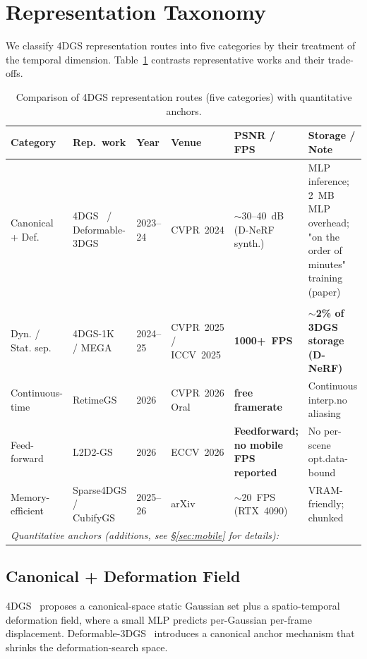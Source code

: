 
\section{Representation Taxonomy}
\label{sec:representation}

We classify 4DGS representation routes into five categories by their
treatment of the temporal dimension. Table~\ref{tab:representation}
contrasts representative works and their trade-offs.

\begin{table}[t]
  \centering
\caption{Comparison of 4DGS representation routes (five categories) with quantitative anchors.}
\label{tab:representation}
\scriptsize
\setlength{\tabcolsep}{3pt}
\renewcommand{\arraystretch}{1.05}
\begin{tabular}{lp{5.2cm}llp{2.4cm}p{4.5cm}}
\toprule
\textbf{Category} & \textbf{Rep.\ work} & \textbf{Year} & \textbf{Venue} & \textbf{PSNR / FPS} & \textbf{Storage / Note} \\
\midrule
Canonical + Def.       & 4DGS~\cite{wu20244dgs} / Deformable-3DGS~\cite{yang2023deformable3dgs} & 2023--24 & CVPR~2024 & $\sim$30--40~dB (D-NeRF synth.) & MLP inference; 2~MB MLP overhead; "on the order of minutes" training (paper) \\\\
Dyn. / Stat. sep.      & 4DGS-1K~\cite{yuan20254dgs1k} / MEGA~\cite{zhang2024mega4dgsacceleration} & 2024--25 & CVPR~2025 / ICCV~2025 & \textbf{1000+~FPS} & \textbf{$\sim$2\% of 3DGS storage (D-NeRF)} \\
Continuous-time        & RetimeGS~\cite{wang2026retimegs} & 2026 & CVPR~2026 Oral & \textbf{free framerate} & Continuous interp.\;no aliasing \\
Feed-forward           & L2D2-GS~\cite{song2026l2d2gs} & 2026 & ECCV~2026     & \textbf{Feedforward; no mobile FPS reported} & No per-scene opt.\;data-bound \\
Memory-efficient       & Sparse4DGS / CubifyGS~\cite{ren2026cubifygs} & 2025--26 & arXiv & $\sim$20~FPS (RTX~4090) & VRAM-friendly; chunked \\
\midrule
\multicolumn{6}{l}{\emph{Quantitative anchors (additions, see \S\ref{sec:mobile} for details):}} \\
\bottomrule
  \end{tabular}
\end{table}

\subsection{Canonical + Deformation Field}
4DGS~\cite{wu20244dgs} proposes a canonical-space static Gaussian set
plus a spatio-temporal deformation field, where a small MLP predicts
per-Gaussian per-frame displacement. Deformable-3DGS~\cite{yang2023deformable3dgs}
introduces a canonical anchor mechanism that shrinks the
deformation-search space.

